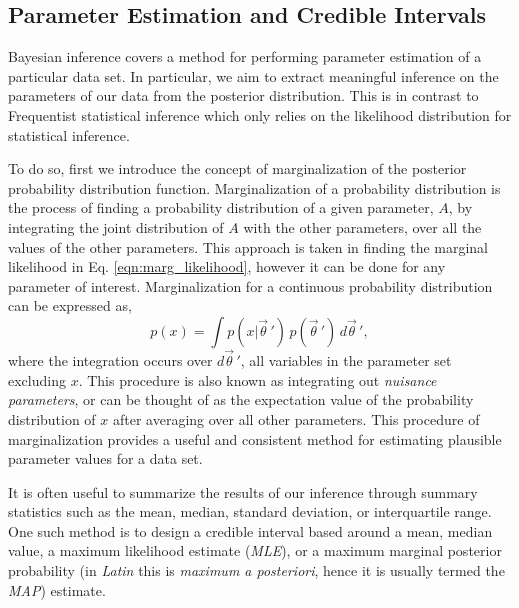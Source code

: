 \subsection{Parameter Estimation and Credible Intervals}
Bayesian inference covers a method for performing parameter estimation of a particular data set. In particular, we aim to extract meaningful inference on the parameters of our data from the posterior distribution. This is in contrast to Frequentist statistical inference which only relies on the likelihood distribution for statistical inference.

To do so, first we introduce the concept of marginalization of the posterior probability distribution function. Marginalization of a probability distribution is the process of finding a probability distribution of a given parameter, $A$, by integrating the joint distribution of $A$ with the other parameters, over all the values of the other parameters. This approach is taken in finding the marginal likelihood in Eq. \ref{eqn:marg_likelihood}, however it can be done for any parameter of interest. Marginalization for a continuous probability distribution can be expressed as,
\begin{equation}
    p(x) = \int p(x|\vec{\theta}\,') \, p(\vec{\theta}\,') \, d\vec{\theta}\,',
\end{equation}
where the integration occurs over $d\vec{\theta}\,'$, all variables in the parameter set excluding $x$. This procedure is also known as integrating out \textit{nuisance parameters}, or can be thought of as the expectation value of the probability distribution of $x$ after averaging over all other parameters. This procedure of marginalization provides a useful and consistent method for estimating plausible parameter values for a data set.

It is often useful to summarize the results of our inference through summary statistics such as the mean, median, standard deviation, or interquartile range. One such method is to design a credible interval based around a mean, median value, a maximum likelihood estimate (\textit{MLE}), or a maximum marginal posterior probability (in \textit{Latin} this is \textit{maximum a posteriori}, hence it is usually termed the \textit{MAP}) estimate.

